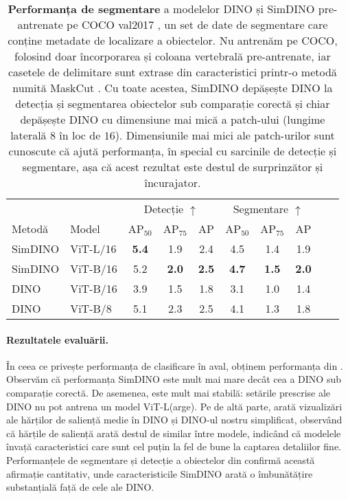 \documentclass[../../book-main_ro.tex]{subfiles}
\begin{document}
\begin{table}
    \centering 
    \begin{tabular}{@{}llcccccccc@{}}
        \toprule
         &  & \multicolumn{3}{c}{Detecție $\uparrow$} &  \multicolumn{3}{c}{Segmentare $\uparrow$} \\ 
        Metodă & Model & AP$_{50}$  & AP$_{75}$ & AP & AP$_{50}$ & AP$_{75}$ & AP  \\ 
        \midrule
        SimDINO &ViT-L/16 &\bf 5.4 &1.9 &2.4 &4.5 &1.4 &1.9 \\
        SimDINO &ViT-B/16 &5.2 & \bf 2.0 & \bf 2.5 & \bf4.7 & \bf 1.5 & \bf 2.0 \\
        DINO &ViT-B/16 &3.9 &1.5 &1.8 &3.1 &1.0 &1.4 \\
        \midrule
        \color{gray} DINO & \color{gray} ViT-B/8 & \color{gray}5.1 & \color{gray}2.3 & \color{gray}2.5 & \color{gray}4.1 & \color{gray}1.3 & \color{gray}1.8 \\
        \bottomrule
    \end{tabular}
    \caption{\small\textbf{Performanța de segmentare} a modelelor DINO și SimDINO pre-antrenate pe COCO val2017 \citep{lin2014microsoft}, un set de date de segmentare care conține metadate de localizare a obiectelor. Nu antrenăm pe COCO, folosind doar încorporarea și coloana vertebrală pre-antrenate, iar casetele de delimitare sunt extrase din caracteristici printr-o metodă numită MaskCut \citep{wang2023cut}. Cu toate acestea, SimDINO depășește DINO la detecția și segmentarea obiectelor sub comparație corectă și chiar depășește DINO cu dimensiune mai mică a patch-ului (lungime laterală \(8\) în loc de \(16\)). Dimensiunile mai mici ale patch-urilor sunt cunoscute că ajută performanța, în special cu sarcinile de detecție și segmentare, așa că acest rezultat este destul de surprinzător și încurajator.}
    \label{tab:dino_segmentation}
\end{table}

\paragraph{Rezultatele evaluării.} În ceea ce privește performanța de clasificare în aval, obținem performanța din . Observăm că performanța SimDINO este mult mai mare decât cea a DINO sub comparație corectă. De asemenea, este mult mai stabilă: setările prescrise ale DINO nu pot antrena un model ViT-L(arge). Pe de altă parte,  arată vizualizări ale hărților de saliență medie în DINO și DINO-ul nostru simplificat, observând că hărțile de saliență arată destul de similar între modele, indicând că modelele învață caracteristici care sunt cel puțin la fel de bune la captarea detaliilor fine. Performanțele de segmentare și detecție a obiectelor din  confirmă această afirmație cantitativ, unde caracteristicile SimDINO arată o îmbunătățire substanțială față de cele ale DINO.
\end{document}
